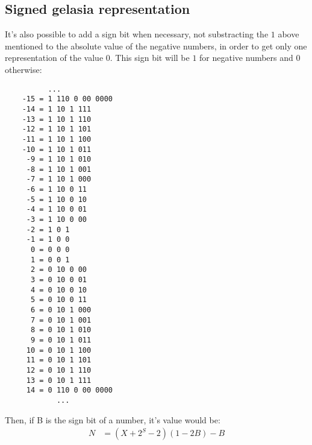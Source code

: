 \documentclass[a4paper,11pt]{article}
\begin{document}
\subsection{Signed gelasia representation}
It's also possible to add a sign bit when necessary, not substracting the $1$ above mentioned to the absolute value of the negative numbers, in order to get only one representation of the value $0$. This sign bit will be $1$ for negative numbers and $0$ otherwise:
\begin{center} \begin{lstlisting}
	      ...
	-15 = 1 110 0 00 0000 
	-14 = 1 10 1 111 
	-13 = 1 10 1 110 
	-12 = 1 10 1 101 
	-11 = 1 10 1 100 
	-10 = 1 10 1 011 
	 -9 = 1 10 1 010 
	 -8 = 1 10 1 001 
	 -7 = 1 10 1 000 
	 -6 = 1 10 0 11 
	 -5 = 1 10 0 10 
	 -4 = 1 10 0 01 
	 -3 = 1 10 0 00
	 -2 = 1 0 1
	 -1 = 1 0 0 
	  0 = 0 0 0 
	  1 = 0 0 1
	  2 = 0 10 0 00
	  3 = 0 10 0 01 
	  4 = 0 10 0 10 
	  5 = 0 10 0 11 
	  6 = 0 10 1 000 
	  7 = 0 10 1 001 
	  8 = 0 10 1 010 
	  9 = 0 10 1 011 
	 10 = 0 10 1 100 
	 11 = 0 10 1 101 
	 12 = 0 10 1 110 
	 13 = 0 10 1 111 
	 14 = 0 110 0 00 0000 
	        ...	
\end{lstlisting} \end{center}
Then, if B is the sign bit of a number, it's value would be:
\begin{align*}
	N&= (X+2^{S}-2)(1-2B)-B
\end{align*}
\end{document}
